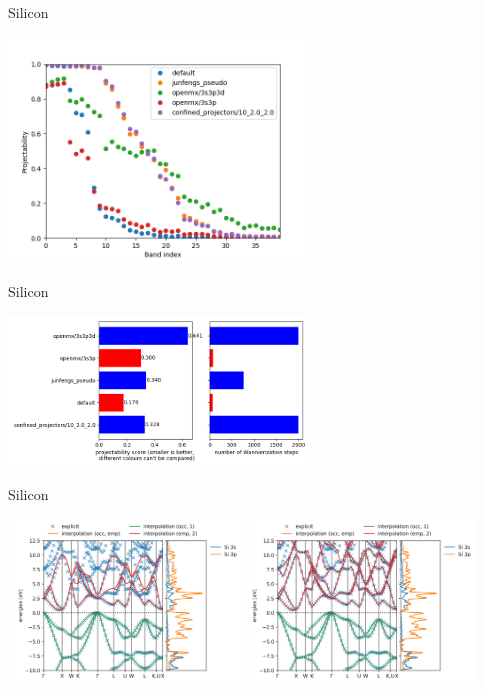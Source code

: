 \documentclass[xcolor=table,aspectratio=169]{beamer}
\numberwithin{equation}{section}
\begin{document}
\begin{frame}{Silicon}
   \begin{center}
   \includegraphics[width=0.6\textwidth]{figures/vconf_tests/Si/projectability.png}
   \end{center}
\end{frame}

\begin{frame}{Silicon}
   \begin{center}
   \includegraphics[width=0.6\textwidth]{figures/vconf_tests/Si/projectability_scores_and_nsteps.png}
   \end{center}
\end{frame}

\begin{frame}{Silicon}
   \begin{center}
   \hbox{
   \includegraphics[width=0.45\textwidth]{figures/vconf_tests/Si/default/51688_wannierization_wannierize_bandstructure.png}
   \raisebox{0.15\textwidth}{\huge $\rightarrow$}
   \includegraphics[width=0.45\textwidth]{figures/vconf_tests/Si/confined_projectors/10_2.0_2.0/51688_wannierization_wannierize_bandstructure.png}
   }
   \end{center}
\end{frame}
\end{document}
